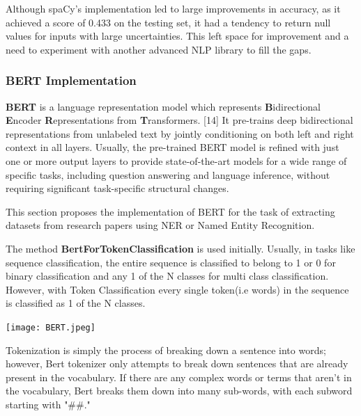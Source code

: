 \documentclass[twocolumn]{article}
\begin{document}
Although spaCy's implementation led to large improvements in accuracy, as it achieved a score of 0.433 on the testing set, it had a tendency to return null values for inputs with large uncertainties. This left space for improvement and a need to experiment with another advanced NLP library to fill the gaps.

\subsubsection{BERT Implementation}
\textbf{BERT} is a language representation model which represents \textbf{B}idirectional \textbf{E}ncoder \textbf{R}epresentations from \textbf{T}ransformers. [14] It pre-trains deep bidirectional representations from unlabeled text by jointly conditioning on both left and right context in all layers. Usually, the pre-trained BERT model is refined with just one or more output layers to provide state-of-the-art models for a wide range of specific tasks, including question answering and language inference, without requiring significant task-specific structural changes. \par

This section proposes the implementation of BERT for the task of extracting datasets from research papers using NER or Named Entity Recognition. \par 

The method \textbf{BertForTokenClassification} is used initially. Usually, in tasks like sequence classification, the entire sequence is classified to belong to 1 or 0 for binary classification and any 1 of the N classes for multi class classification. However, with Token Classification every single token(i.e words) in the sequence is classified as 1 of the N classes. \par 

\begin{center}
\hspace*{-0.2cm}
\texttt{[image: BERT.jpeg]}
\end{center}

Tokenization is simply the process of breaking down a sentence into words; however, Bert tokenizer only attempts to break down sentences that are already present in the vocabulary. If there are any complex words or terms that aren't in the vocabulary, Bert breaks them down into many sub-words, with each subword starting with "\#\#."
\end{document}
